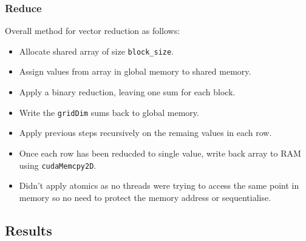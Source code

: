 \documentclass[12pt]{article}
\begin{document}
\subsubsection*{Reduce}
	Overall method for vector reduction as follows:
	\begin{itemize}
	\item Allocate shared array of size \texttt{block\_size}.
	\item Assign values from array in global memory to shared memory.
	\item Apply a binary reduction, leaving one sum for each block.
	\item Write the \texttt{gridDim} sums back to global memory.
	\item Apply previous steps recursively on the remaing values in each row.
	\item Once each row has been reducded to single value, write back array to RAM using \texttt{cudaMemcpy2D}.
	\item Didn't apply atomics as no threads were trying to access the same point in memory so no need to protect the memory address or sequentialise.
	\end{itemize}
	\pagebreak
\subsection*{Results}
\end{document}
